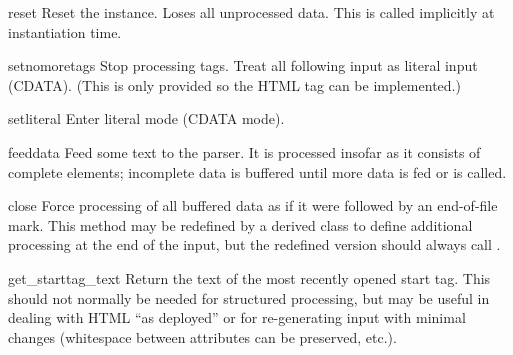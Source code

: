 \begin{methoddesc}{reset}{}
Reset the instance.  Loses all unprocessed data.  This is called
implicitly at instantiation time.
\end{methoddesc}

\begin{methoddesc}{setnomoretags}{}
Stop processing tags.  Treat all following input as literal input
(CDATA).  (This is only provided so the HTML tag
 can be implemented.)
\end{methoddesc}

\begin{methoddesc}{setliteral}{}
Enter literal mode (CDATA mode).
\end{methoddesc}

\begin{methoddesc}{feed}{data}
Feed some text to the parser.  It is processed insofar as it consists
of complete elements; incomplete data is buffered until more data is
fed or  is called.
\end{methoddesc}

\begin{methoddesc}{close}{}
Force processing of all buffered data as if it were followed by an
end-of-file mark.  This method may be redefined by a derived class to
define additional processing at the end of the input, but the
redefined version should always call .
\end{methoddesc}

\begin{methoddesc}{get_starttag_text}{}
Return the text of the most recently opened start tag.  This should
not normally be needed for structured processing, but may be useful in
dealing with HTML ``as deployed'' or for re-generating input with
minimal changes (whitespace between attributes can be preserved,
etc.).
\end{methoddesc}

